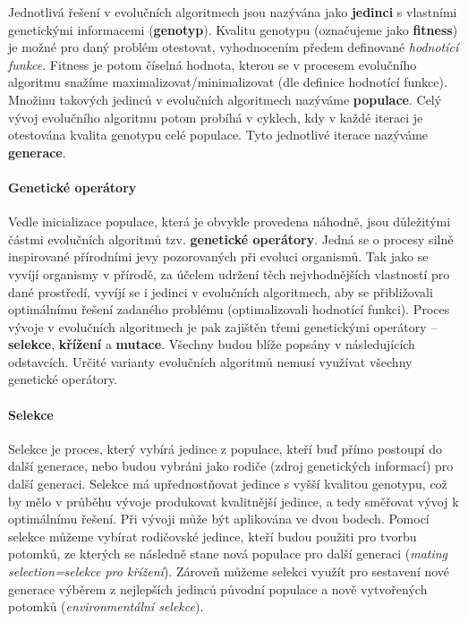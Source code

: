Jednotlivá řešení v evolučních algoritmech jsou nazývána jako \textbf{jedinci}
s vlastními genetickými informacemi (\textbf{genotyp}). Kvalitu genotypu
(označujeme jako \textbf{fitness}) je možné pro daný problém otestovat,
vyhodnocením předem definované \emph{hodnotící funkce}. Fitness je potom číselná
hodnota, kterou se v procesem evolučního algoritmu snažíme
maximalizovat/minimalizovat (dle definice hodnotící funkce). Množinu takových
jedinců v evolučních algoritmech nazýváme \textbf{populace}. Celý vývoj
evolučního algoritmu potom probíhá v cyklech, kdy v každé iteraci je otestována
kvalita genotypu celé populace. Tyto jednotlivé iterace nazýváme
\textbf{generace}.

\paragraph{Genetické operátory} \label{Evoluční algoritmy - operátory}
Vedle inicializace populace, která je obvykle provedena náhodně, jsou
důležitými částmi evolučních algoritmů tzv. \textbf{genetické operátory}. Jedná
se o procesy silně inspirované přírodními jevy pozorovaných při evoluci
organismů. Tak jako se vyvíjí organismy v přírodě, za účelem udržení těch
nejvhodnějších vlastností pro dané prostředí, vyvíjí se i jedinci v evolučních
algoritmech, aby se přibližovali optimálnímu řešení zadaného problému
(optimalizovali hodnotící funkci). Proces vývoje v evolučních algoritmech je
pak zajištěn třemi genetickými operátory -- \textbf{selekce}, \textbf{křížení}
a \textbf{mutace}. Všechny budou blíže popsány v následujících odstavcích.
Určité varianty evolučních algoritmů nemusí využívat všechny genetické
operátory.

\paragraph{Selekce}
Selekce je proces, který vybírá jedince z populace, kteří buď přímo postoupí do
další generace, nebo budou vybráni jako rodiče (zdroj genetických informací)
pro další generaci. Selekce má upřednostňovat jedince s vyšší kvalitou
genotypu, což by mělo v průběhu vývoje produkovat kvalitnější jedince, a tedy
směřovat vývoj k optimálnímu řešení. Při vývoji může být aplikována ve dvou
bodech. Pomocí selekce můžeme vybírat rodičovské jedince, kteří budou použiti
pro tvorbu potomků, ze kterých se následně stane nová populace pro další
generaci (\emph{mating selection=selekce pro křížení}). Zároveň můžeme selekci
využít pro sestavení nové generace výběrem z nejlepších jedinců původní
populace a nově vytvořených potomků (\emph{environmentální selekce}).

